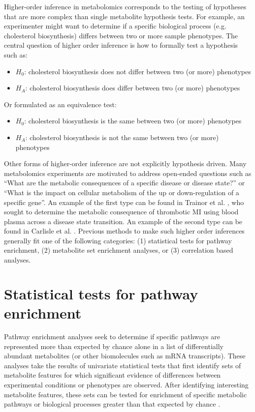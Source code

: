Higher-order inference in metabolomics corresponds to the testing of hypotheses that are more complex than single metabolite hypothesis tests. For example, an experimenter might want to determine if a specific biological process (e.g. cholesterol biosynthesis) differs between two or more sample phenotypes. The central question of higher order inference is how to formally test a hypothesis such as:
\begin{itemize}
	\item $H_0$: cholesterol biosynthesis does not differ between two (or more) phenotypes 
	\item $H_A$: cholesterol biosynthesis does differ between two (or more) phenotypes
\end{itemize} 
Or formulated as an equivalence test:
\begin{itemize}
	\item $H_0$: cholesterol biosynthesis is the same between two (or more) phenotypes 
	\item $H_A$: cholesterol biosynthesis is not the same between two (or more) phenotypes
\end{itemize}

Other forms of higher-order inference are not explicitly hypothesis driven. Many metabolomics experiments are motivated to address open-ended questions such as ``What are the metabolic consequences of a specific disease or disease state?'' or ``What is the impact on cellular metabolism of the up or down-regulation of a specific gene''. An example of the first type can be found in Trainor et al. \cite{trainor2017}, who sought to determine the metabolic consequence of thrombotic MI using blood plasma across a disease state transition. An example of the second type can be found in Carlisle et al. \cite{carlisle2016}. Previous methods to make such higher order inferences generally fit one of the following categories: (1) statistical tests for pathway enrichment, (2) metabolite set enrichment analyses, or (3) correlation based analyses. 

\section{Statistical tests for pathway enrichment}
Pathway enrichment analyses seek to determine if specific pathways are represented more than expected by chance alone in a list of differentially abundant metabolites (or other biomolecules such as mRNA transcripts). These analyses take the results of univariate statistical tests that first identify sets of metabolite features for which significant evidence of differences between experimental conditions or phenotypes are observed. After identifying interesting metabolite features, these sets can be tested for enrichment of specific metabolic pathways or biological processes greater than that expected by chance \cite{goeman2007,xia2010}. 

